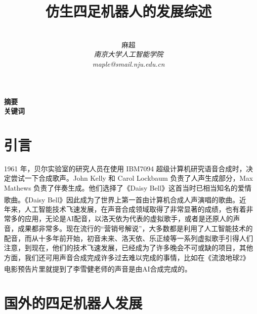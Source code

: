 \documentclass[12pt,a4paper]{ctexart}
\title{\textbf{仿生四足机器人的发展综述}}
\author{
\\
\Large{麻超 \quad 201300066}
\\[6pt]
{ \large \textit{南京大学人工智能学院}}\\[2pt]\large \textit{maple@smail.nju.edu.cn}
}
\date{}
\newcommand{\supercite}[1]{\textsuperscript{\cite{#1}}}
\begin{document}
\maketitle
\setcounter{page}{1}
\textbf{摘要}  \\

\textbf{关键词}
\\[60pt]
\section{引言}
1961 年，贝尔实验室的研究人员在使用 IBM7094 超级计算机研究语音合成时，决定尝试一下合成歌声。John Kelly 和 Carol Lockbaum 负责了人声生成部分，Max Mathews 负责了伴奏生成。他们选择了《Daisy Bell》这首当时已相当知名的爱情歌曲。《Daisy Bell》因此成为了世界上第一首由计算机合成人声演唱的歌曲\supercite{1}。近年来，人工智能技术飞速发展，在声音合成领域取得了非常显著的成绩，也有着非常多的应用，无论是AI配音，以洛天依为代表的虚拟歌手，或者是还原人的声音，成果都非常多。现在流行的“营销号解说”，大多数都是利用了人工智能技术的配音，而从十多年前开始，初音未来、洛天依、乐正绫等一系列虚拟歌手引得人们注意，到现在，他们的技术飞速发展，已经成为了许多晚会不可或缺的项目，其他方面，我们还可用声音合成完成许多过去难以完成的事情，比如在《流浪地球2》电影预告片里就提到了李雪健老师的声音是由AI合成完成的\supercite{2}。
\section{国外的四足机器人发展}
\end{document}
